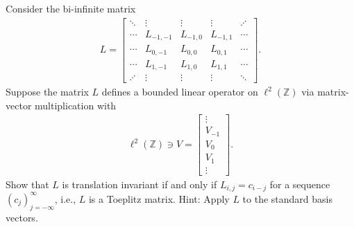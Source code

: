 \documentclass[12pt]{report}
\begin{document}
\begin{problem}
    Consider the bi-infinite matrix
    \begin{align*}
      L = \begin{bmatrix}
        \ddots & \vdots & \vdots & \vdots  & \iddots \\
        \cdots & L_{-1,-1} & L_{-1,0} & L_{-1,1} & \cdots \\
        \cdots & L_{0,-1} & L_{0,0} & L_{0,1} & \cdots \\
        \cdots & L_{1,-1} & L_{1,0} & L_{1,1} & \cdots \\
        \iddots & \vdots & \vdots & \vdots & \ddots
      \end{bmatrix}.                
    \end{align*}
    Suppose the matrix $L$ defines a bounded linear operator on $\ell^2(\mathbb Z)$ via matrix-vector multiplication with
    \begin{align*}
     \ell^2(\mathbb Z) \ni V = \begin{bmatrix} \vdots \\ V_{-1} \\ V_0 \\ V_1 \\\vdots \end{bmatrix}.
    \end{align*}
    Show that $L$ is translation invariant if and only if $L_{i,j} = c_{i - j}$ for a sequence $(c_j)_{j=-\infty}^\infty$, i.e., $L$ is a Toeplitz matrix.  Hint: Apply $L$ to the standard basis vectors.
\end{problem}
\end{document}
